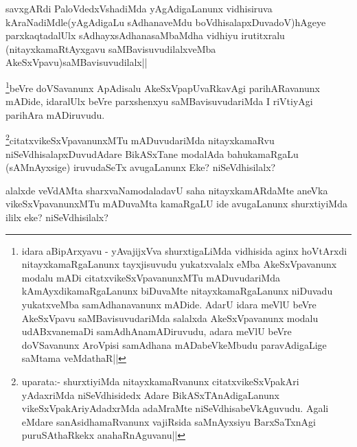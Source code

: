 \begin{artha}
savxgARdi PaloVdedxVshadiMda yAgAdigaLanunx vidhisiruva kAraNadiMdle(yAgAdigaLu sAdhanaveMdu boVdhisalapxDuvadoV)hAgeye parxkaqtadalUlx sAdhayxsAdhanasaMbaMdha vidhiyu irutitxralu (nitayxkamaRtAyxgavu saMBavisuvudilalxveMba AkeSxVpavu)saMBavisuvudilalx||
\end{artha}


\begin{artha}
\footnote{idara aBipArxyavu - yAvajijxVva shurxtigaLiMda vidhisida aginx hoVtArxdi nitayxkamaRgaLanunx tayxjisuvudu yukatxvalalx eMba AkeSxVpavanunx modalu mADi citatxvikeSxVpavanunxMTu mADuvudariMda kAmAyxdikamaRgaLanunx biDuvaMte nitayxkamaRgaLanunx niDuvadu yukatxveMba samAdhanavanunx mADide. AdarU idara meVlU beVre AkeSxVpavu saMBavisuvudariMda salalxda AkeSxVpavanunx modalu udABxvanemaDi samAdhAnamADiruvudu, adara meVlU beVre doVSavanunx AroVpisi samAdhana mADabeVkeMbudu  paravAdigaLige saMtama veMdathaR||}beVre doVSavanunx ApAdisalu AkeSxVpapUvaRkavAgi parihARavanunx mADide, idaralUlx beVre parxshenxyu saMBavisuvudariMda I riVtiyAgi parihAra mADiruvudu.
\end{artha}

\begin{artha}
\footnote{uparata:- shurxtiyiMda nitayxkamaRvanunx citatxvikeSxVpakAri yAdaxriMda niSeVdhisidedx Adare BikASxTAnAdigaLanunx vikeSxVpakAriyAdadxrMda  adaMraMte niSeVdhisabeVkAguvudu. Agali eMdare sanAsidhamaRvanunx vajiRsida saMnAyxsiyu BarxSaTxnAgi puruSAthaRkekx anahaRnAguvanu||}citatxvikeSxVpavanunxMTu mADuvudariMda nitayxkamaRvu niSeVdhisalapxDuvudAdare BikASxTane modalAda bahukamaRgaLu (sAMnAyxsige) iruvudaSeTx avugaLanunx Eke? niSeVdhisilalx?
\end{artha}


\begin{artha}
alalxde veVdAMta sharxvaNamodaladavU saha nitayxkamARdaMte aneVka vikeSxVpavanunxMTu mADuvaMta kamaRgaLU ide avugaLanunx shurxtiyiMda ililx eke? niSeVdhisilalx?
\end{artha}

